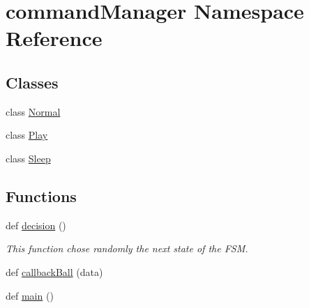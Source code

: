 \hypertarget{namespacecommandManager}{}\section{command\+Manager Namespace Reference}
\label{namespacecommandManager}
\subsection*{Classes}
\begin{DoxyCompactItemize}
\item 
class \hyperlink{classcommandManager_1_1Normal}{Normal}
\item 
class \hyperlink{classcommandManager_1_1Play}{Play}
\item 
class \hyperlink{classcommandManager_1_1Sleep}{Sleep}
\end{DoxyCompactItemize}
\subsection*{Functions}
\begin{DoxyCompactItemize}
\item 
def \hyperlink{namespacecommandManager_a4b8947837e5d1af29943bfcf09e748f4}{decision} ()
\begin{DoxyCompactList}\small\item\em This function chose randomly the next state of the F\+SM. \end{DoxyCompactList}\item 
def \hyperlink{namespacecommandManager_a161f6f7da030b1c4e9091675ca6ff398}{callback\+Ball} (data)
\item 
def \hyperlink{namespacecommandManager_ae8b570eb4bf393859bc74c9cb5fe125f}{main} ()
\end{DoxyCompactItemize}
